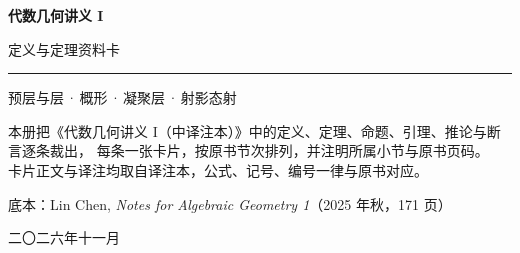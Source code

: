 \documentclass[UTF8,10pt,fontset=windows]{ctexart}
\begin{document}
\begin{titlepage}
\centering
\vspace*{34mm}
{\sffamily\bfseries\fontsize{30}{38}\selectfont 代数几何讲义 I\par}
\vspace{5mm}
{\sffamily\fontsize{17}{22}\selectfont 定义与定理资料卡\par}
\vspace{12mm}
{\color{accent}\rule{0.55\linewidth}{1.1pt}\par}
\vspace{10mm}
{\large 预层与层\,·\,概形\,·\,凝聚层\,·\,射影态射\par}
\vspace{26mm}
\begin{minipage}{0.72\linewidth}\centering\small
本册把《代数几何讲义 I（中译注本）》中的定义、定理、命题、引理、推论与断言逐条裁出，
每条一张卡片，按原书节次排列，并注明所属小节与原书页码。\\
卡片正文与译注均取自译注本，公式、记号、编号一律与原书对应。
\end{minipage}
\vfill
{\small 底本：Lin Chen, \emph{Notes for Algebraic Geometry 1}（2025 年秋，171 页）\par}
\vspace{4mm}
{\small 二〇二六年十一月\par}
\end{titlepage}
\end{document}
